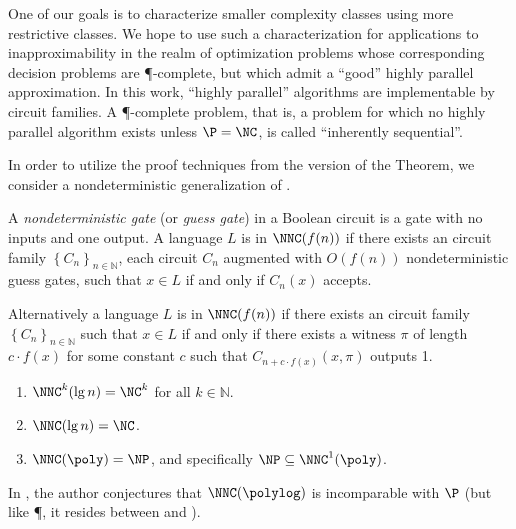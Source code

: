 \documentclass[]{article}
\begin{document}
One of our goals is to characterize smaller complexity classes using more restrictive \PCP{} classes.
We hope to use such a characterization for applications to inapproximability in the realm of optimization problems whose corresponding decision problems are \P-complete, but which admit a ``good'' highly parallel approximation.
In this work, ``highly parallel'' algorithms are implementable by \NC{} circuit families.
A \P-complete problem, that is, a problem for which no highly parallel algorithm exists unless $\P = \NC$, is called ``inherently sequential''.

In order to utilize the proof techniques from the \NP{} version of the \PCP{} Theorem, we consider a nondeterministic generalization of \NC.
\begin{definition}
  A \emph{nondeterministic gate} (or \emph{guess gate}) in a Boolean circuit is a gate with no inputs and one output.
  A language $L$ is in $\NNC(f(n))$ if there exists an \NC{} circuit family $\left\{C_n\right\}_{n \in \mathbb{N}}$, each circuit $C_n$ augmented with $O(f(n))$ nondeterministic guess gates, such that $x \in L$ if and only if $C_n(x)$ accepts.

  Alternatively a language $L$ is in $\NNC(f(n))$ if there exists an \NC{} circuit family $\left\{C_n\right\}_{n \in \mathbb{N}}$ such that $x \in L$ if and only if there exists a witness $\pi$ of length $c \cdot f(x)$ for some constant $c$ such that $C_{n + c \cdot f(x)}(x, \pi)$ outputs 1.
\end{definition}

\begin{proposition}\label{prop:nnc}
  \mbox{}
  \begin{enumerate}
  \item $\NNC^k(\lg n) = \NC^k$ for all $k \in \mathbb{N}$.
  \item $\NNC(\lg n) = \NC$.
  \item $\NNC(\poly) = \NP$, and specifically $\NP \subseteq \NNC^1(\poly)$.
  \end{enumerate}
\end{proposition}

In \cite{wolf94}, the author conjectures that $\NNC(\polylog)$ is incomparable with $\P$ (but like \P, it resides between \NC{} and \NP).
\end{document}
